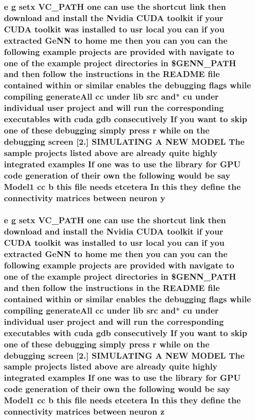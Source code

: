 \hypertarget{README_8txt_a920a9c177ac2efcc655675077d034047}{
\subsubsection[{y}]{\setlength{\rightskip}{0pt plus 5cm}e g setx V\+C\+\_\+\+P\+A\+T\+H one can {\bf use} the shortcut link then download and install the Nvidia C\+U\+D\+A toolkit if your C\+U\+D\+A toolkit was installed {\bf to} usr local you can if you extracted {\bf Ge\+N\+N} {\bf to} home me then you can you can the following example projects are provided {\bf with} navigate {\bf to} one of the example {\bf project} directories {\bf in} \$G\+E\+N\+N\+\_\+\+P\+A\+T\+H and then follow the instructions {\bf in} the R\+E\+A\+D\+M\+E {\bf file} contained within {\bf or} similar enables the debugging flags while compiling generate\+All cc under lib src and$\ast$ cu under individual user {\bf project} and will run the corresponding executables {\bf with} {\bf cuda} gdb consecutively If you want {\bf to} skip one of these debugging simply press r while on the debugging screen \mbox{[}2.\mbox{]} S\+I\+M\+U\+L\+A\+T\+I\+N\+G A N\+E\+W M\+O\+D\+E\+L The sample projects listed above are already quite highly integrated examples If one was {\bf to} {\bf use} the library for {\bf G\+P\+U} {\bf code} generation of their own the following would be say Model1 cc b this {\bf file} needs etcetera In this they define the connectivity matrices between neuron y}}\label{README_8txt_a920a9c177ac2efcc655675077d034047}
\hypertarget{README_8txt_aafdc1369e947728304a2911ed1b087c1}{
\subsubsection[{z}]{\setlength{\rightskip}{0pt plus 5cm}e g setx V\+C\+\_\+\+P\+A\+T\+H one can {\bf use} the shortcut link then download and install the Nvidia C\+U\+D\+A toolkit if your C\+U\+D\+A toolkit was installed {\bf to} usr local you can if you extracted {\bf Ge\+N\+N} {\bf to} home me then you can you can the following example projects are provided {\bf with} navigate {\bf to} one of the example {\bf project} directories {\bf in} \$G\+E\+N\+N\+\_\+\+P\+A\+T\+H and then follow the instructions {\bf in} the R\+E\+A\+D\+M\+E {\bf file} contained within {\bf or} similar enables the debugging flags while compiling generate\+All cc under lib src and$\ast$ cu under individual user {\bf project} and will run the corresponding executables {\bf with} {\bf cuda} gdb consecutively If you want {\bf to} skip one of these debugging simply press r while on the debugging screen \mbox{[}2.\mbox{]} S\+I\+M\+U\+L\+A\+T\+I\+N\+G A N\+E\+W M\+O\+D\+E\+L The sample projects listed above are already quite highly integrated examples If one was {\bf to} {\bf use} the library for {\bf G\+P\+U} {\bf code} generation of their own the following would be say Model1 cc b this {\bf file} needs etcetera In this they define the connectivity matrices between neuron z}}\label{README_8txt_aafdc1369e947728304a2911ed1b087c1}
